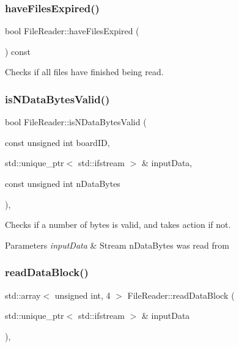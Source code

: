 \subsubsection{\texorpdfstring{have\+Files\+Expired()}{haveFilesExpired()}}
{\footnotesize\ttfamily bool File\+Reader\+::have\+Files\+Expired (\begin{DoxyParamCaption}{ }\end{DoxyParamCaption}) const\hspace{0.3cm}{\ttfamily [inline]}}



Checks if all files have finished being read. 

\mbox{\label{class_file_reader_ac3938817d6fd8b2d90ac479e323bdc03}} 
\subsubsection{\texorpdfstring{is\+N\+Data\+Bytes\+Valid()}{isNDataBytesValid()}}
{\footnotesize\ttfamily bool File\+Reader\+::is\+N\+Data\+Bytes\+Valid (\begin{DoxyParamCaption}\item[{const unsigned int}]{board\+ID,  }\item[{std\+::unique\+\_\+ptr$<$ std\+::ifstream $>$ \&}]{input\+Data,  }\item[{const unsigned int}]{n\+Data\+Bytes }\end{DoxyParamCaption})\hspace{0.3cm}{\ttfamily [inline]}, {\ttfamily [private]}}



Checks if a number of bytes is valid, and takes action if not. 


\begin{DoxyParams}{Parameters}
{\em input\+Data} & Stream n\+Data\+Bytes was read from \\
\hline
\end{DoxyParams}
\mbox{\label{class_file_reader_ac578b683eba751027766a2c30f03a28b}} 
\subsubsection{\texorpdfstring{read\+Data\+Block()}{readDataBlock()}}
{\footnotesize\ttfamily std\+::array$<$ unsigned int, 4 $>$ File\+Reader\+::read\+Data\+Block (\begin{DoxyParamCaption}\item[{std\+::unique\+\_\+ptr$<$ std\+::ifstream $>$ \&}]{input\+Data }\end{DoxyParamCaption})\hspace{0.3cm}{\ttfamily [inline]}, {\ttfamily [private]}}



